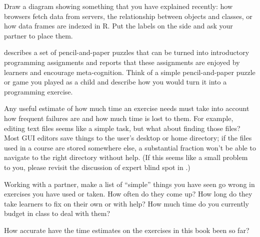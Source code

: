 Draw a diagram showing something that you have explained recently:
how browsers fetch data from servers,
the relationship between objects and classes,
or how data frames are indexed in R.
Put the labels on the side and ask your partner to place them.


\cite{Butl2017} describes a set of pencil-and-paper puzzles
that can be turned into introductory programming assignments
and reports that these assignments are enjoyed by learners and encourage meta-cognition.
Think of a simple pencil-and-paper puzzle or game you played as a child
and describe how you would turn it into a programming exercise.


Any useful estimate of how much time an exercise needs
must take into account how frequent failures are
and how much time is lost to them.
For example,
editing text files seems like a simple task,
but what about finding those files?
Most GUI editors save things to the user's desktop or home directory;
if the files used in a course are stored somewhere else,
a substantial fraction won't be able to navigate to the right directory without help.
(If this seems like a small problem to you,
please revisit the discussion of expert blind spot in .)

Working with a partner,
make a list of ``simple'' things you have seen go wrong in exercises you have used or taken.
How often do they come up?
How long do they take learners to fix on their own or with help?
How much time do you currently budget in class to deal with them?


How accurate have the time estimates on the exercises in this book been so far?
